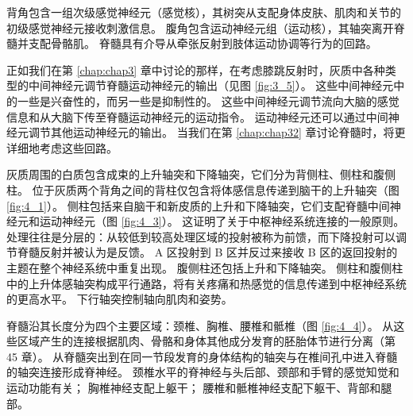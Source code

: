 背角包含一组次级感觉神经元（感觉核），其树突从支配身体皮肤、肌肉和关节的初级感觉神经元接收刺激信息。 腹角包含运动神经元组（运动核），其轴突离开脊髓并支配骨骼肌。 
脊髓具有介导从牵张反射到肢体运动协调等行为的回路。


正如我们在第 \ref{chap:chap3} 章中讨论的那样，在考虑膝跳反射时，灰质中各种类型的中间神经元调节脊髓运动神经元的输出（见图 \ref{fig:3_5}）。 
这些中间神经元中的一些是兴奋性的，而另一些是抑制性的。 
这些中间神经元调节流向大脑的感觉信息和从大脑下传至脊髓运动神经元的运动指令。 
运动神经元还可以通过中间神经元调节其他运动神经元的输出。 
当我们在第 \ref{chap:chap32} 章讨论脊髓时，将更详细地考虑这些回路。


灰质周围的白质包含成束的上升轴突和下降轴突，它们分为背侧柱、侧柱和腹侧柱。
位于灰质两个背角之间的背柱仅包含将体感信息传递到脑干的上升轴突（图 \ref{fig:4_1}）。 
侧柱包括来自脑干和新皮质的上升和下降轴突，它们支配脊髓中间神经元和运动神经元（图 \ref{fig:4_3}）。 
这证明了关于中枢神经系统连接的一般原则。 
处理往往是分层的：从较低到较高处理区域的投射被称为前馈，而下降投射可以调节脊髓反射并被认为是反馈。 
A 区投射到 B 区并反过来接收 B 区的返回投射的主题在整个神经系统中重复出现。 
腹侧柱还包括上升和下降轴突。 
侧柱和腹侧柱中的上升体感轴突构成平行通路，将有关疼痛和热感觉的信息传递到中枢神经系统的更高水平。 
下行轴突控制轴向肌肉和姿势。


脊髓沿其长度分为四个主要区域：颈椎、胸椎、腰椎和骶椎（图 \ref{fig:4_4}）。 
从这些区域产生的连接根据肌肉、骨骼和身体其他成分发育的胚胎体节进行分离（第 45 章）。 
从脊髓突出到在同一节段发育的身体结构的轴突与在椎间孔中进入脊髓的轴突连接形成脊神经。 
颈椎水平的脊神经与头后部、颈部和手臂的感觉知觉和运动功能有关； 
胸椎神经支配上躯干； 腰椎和骶椎神经支配下躯干、背部和腿部。


